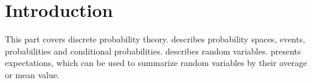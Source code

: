 \chapter{Introduction}
\label{ch:probability::introduction}

\begin{gram}
%

This part covers discrete probability theory.
%
 describes probability spaces, events, probabilities
and conditional probabilities.
%
 describes random variables.
%
 presents expectations, which can be used
to summarize random variables by their average or mean value.
%
\end{gram}


